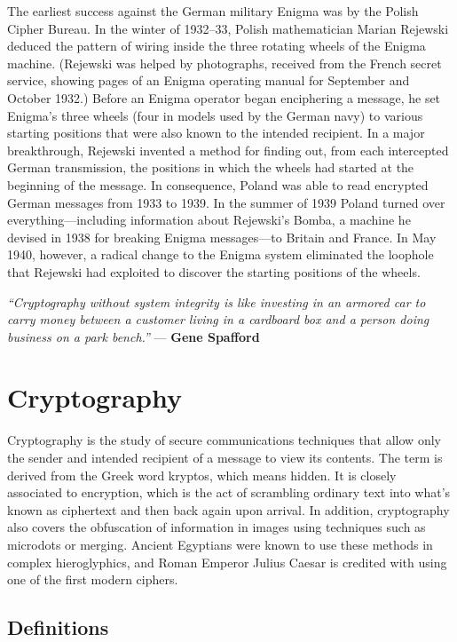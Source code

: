 \documentclass[12pt,a4paper]{article}
\begin{document}
	
	\newline
	 The earliest success against the German military Enigma was by the Polish Cipher Bureau. In the winter of 1932–33, Polish mathematician Marian Rejewski deduced the pattern of wiring inside the three rotating wheels of the Enigma machine. (Rejewski was helped by photographs, received from the French secret service, showing pages of an Enigma operating manual for September and October 1932.) Before an Enigma operator began enciphering a message, he set Enigma’s three wheels (four in models used by the German navy) to various starting positions that were also known to the intended recipient. In a major breakthrough, Rejewski invented a method for finding out, from each intercepted German transmission, the positions in which the wheels had started at the beginning of the message. In consequence, Poland was able to read encrypted German messages from 1933 to 1939. In the summer of 1939 Poland turned over everything—including information about Rejewski’s Bomba, a machine he devised in 1938 for breaking Enigma messages—to Britain and France. In May 1940, however, a radical change to the Enigma system eliminated the loophole that Rejewski had exploited to discover the starting positions of the wheels.
	
	\vskip 2.12cm
	\textit{“Cryptography without system integrity is like investing in an armored car to carry money between a customer living in a cardboard box and a person doing business on a park bench.”} — \textbf{Gene Spafford}
	
	\newpage
	\section{Cryptography}
	
	
	Cryptography is the study of secure communications techniques that allow only the sender and intended recipient of a message to view its contents. The term is derived from the Greek word kryptos, which means hidden. It is closely associated to encryption, which is the act of scrambling ordinary text into what's known as ciphertext and then back again upon arrival. In addition, cryptography also covers the obfuscation of information in images using techniques such as microdots or merging. Ancient Egyptians were known to use these methods in complex hieroglyphics, and Roman Emperor Julius Caesar is credited with using one of the first modern ciphers.
	\subsection{Definitions}
	
\end{document}
